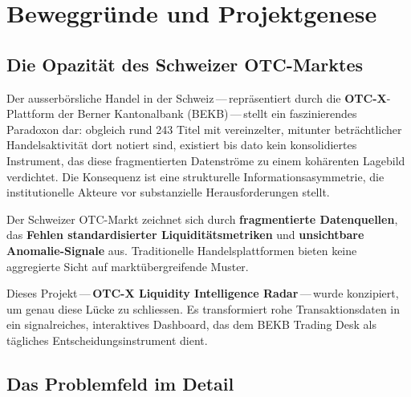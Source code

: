\documentclass[12pt, a4paper, oneside]{report}
\newcommand{\term}[1]{\textcolor{swissred}{\textsf{\textbf{#1}}}}
\begin{document}
\tableofcontents
\clearpage
\listoftables
\clearpage
\listoffigures
\clearpage

\setcounter{page}{1}


\chapter{Beweggr\"unde und Projektgenese}
\label{ch:beweggruende}

\section{Die Opazit\"at des Schweizer OTC-Marktes}

Der ausserb\"orsliche Handel in der Schweiz\,---\,repr\"asentiert durch die \term{OTC-X}-Plattform der Berner Kantonalbank (BEKB)\,---\,stellt ein faszinierendes Paradoxon dar: obgleich rund 243 Titel mit vereinzelter, mitunter betr\"achtlicher Handelsaktivit\"at dort notiert sind, existiert bis dato kein konsolidiertes Instrument, das diese fragmentierten Datenstr\"ome zu einem koh\"arenten Lagebild verdichtet. Die Konsequenz ist eine strukturelle Informationsasymmetrie, die institutionelle Akteure vor substanzielle Herausforderungen stellt.

\begin{infobox}[Problemstellung]
Der Schweizer OTC-Markt zeichnet sich durch \textbf{fragmentierte Datenquellen}, das \textbf{Fehlen standardisierter Liquidit\"atsmetriken} und \textbf{unsichtbare Anomalie-Signale} aus. Traditionelle Handelsplattformen bieten keine aggregierte Sicht auf markt\"ubergreifende Muster.
\end{infobox}

Dieses Projekt\,---\,\textbf{OTC-X Liquidity Intelligence Radar}\,---\,wurde konzipiert, um genau diese L\"ucke zu schliessen. Es transformiert rohe Transaktionsdaten in ein signalreiches, interaktives Dashboard, das dem BEKB Trading Desk als t\"agliches Entscheidungsinstrument dient.

\section{Das Problemfeld im Detail}
\end{document}
